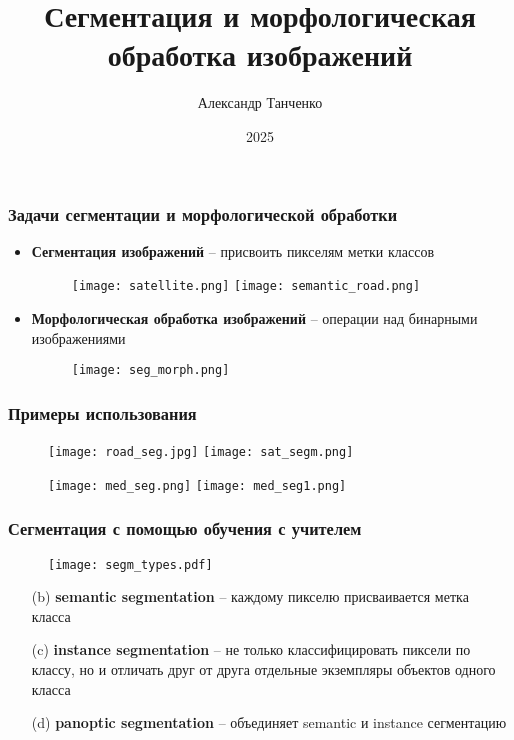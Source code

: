 \documentclass[12pt, usepdftitle=false, aspectratio=1610]{beamer}
\title[Лекция 6]{Сегментация и морфологическая обработка изображений}
\author{Александр Танченко}
\institute{}
\date{2025}
\begin{document}
\begin{frame}
    \titlepage
\end{frame}

\begin{frame}
\frametitle{Задачи сегментации и морфологической обработки}
\begin{itemize}
    \item \textbf{Сегментация изображений} -- присвоить пикселям метки классов
    \begin{figure}
        \centering
        \texttt{[image: satellite.png]}
        \hspace{0.3cm}
        \texttt{[image: semantic\_road.png]}
    \end{figure}
    \vspace*{0.5cm}
    \item \textbf{Морфологическая обработка изображений} -- операции над бинарными изображениями
    \begin{figure}
        \centering
        \texttt{[image: seg\_morph.png]}
    \end{figure}
\end{itemize}
\end{frame}

\begin{frame}
\frametitle{Примеры использования}
\begin{figure}
    \centering
    \texttt{[image: road\_seg.jpg]}
    \texttt{[image: sat\_segm.png]}
\end{figure}
\begin{figure}
    \centering
    \texttt{[image: med\_seg.png]}
    \texttt{[image: med\_seg1.png]}
\end{figure}
\end{frame}

\begin{frame}
\frametitle{Сегментация с помощью обучения с учителем}
\begin{figure}
    \centering
    \texttt{[image: segm\_types.pdf]}
\end{figure}
\begin{itemize}
    \item[(b)] \textbf{semantic segmentation} -- каждому пикселю присваивается метка класса
    \item[(c)] \textbf{instance segmentation} -- не только классифицировать пиксели по классу, но и отличать друг от друга отдельные экземпляры объектов одного класса
    \item[(d)] \textbf{panoptic segmentation} -- объединяет semantic и instance сегментацию
\end{itemize}
\end{frame}
\end{document}
